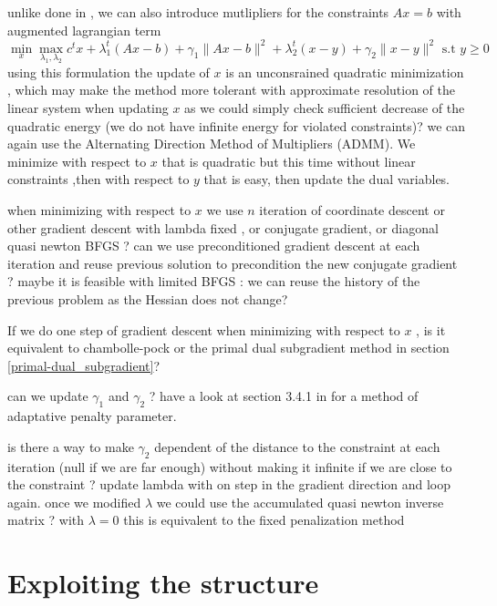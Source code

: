 \documentclass[11pt]{article}
\begin{document}
unlike done in  \cite{Boyd2010}, we can also introduce mutlipliers for the constraints $Ax=b$ with augmented lagrangian term 
\begin{equation}
\mathop{min}_x \mathop{max}_{\lambda_1,\lambda_2} c^tx +\lambda_1^t(Ax-b)+ \gamma_1\|Ax-b\|^2+\lambda_2^t (x-y)+\gamma_2\|x-y\|^2 \text{ s.t } y\geq 0
\end{equation}
using this formulation  the update of $x$ is an unconsrained quadratic minimization , which may make the method more tolerant with approximate resolution of the linear system when updating $x$ as we could simply check sufficient decrease of the quadratic  energy (we do not have infinite energy for violated constraints)? 
we can again use the Alternating Direction Method of Multipliers (ADMM).
We minimize with respect to $x$ that is quadratic but this time without linear constraints ,then with respect to $y$ that is easy, then update the dual variables.



when minimizing with respect to $x$ we use $n$ iteration of coordinate descent or other gradient descent with lambda fixed , or conjugate gradient, or diagonal quasi newton BFGS ? can we use preconditioned gradient descent at each iteration and reuse previous solution to precondition the new conjugate gradient ?
maybe it is feasible with limited BFGS : we can reuse the history of the previous problem as the Hessian does not change? 

If we do one step of gradient descent when minimizing with respect to $x$ , is it equivalent to chambolle-pock or the primal dual subgradient method in section \ref{primal-dual_subgradient}? 


 can we update $\gamma_1$ and $\gamma_2$ ?
have a look at section 3.4.1 in  \cite{Boyd2010} for a method of adaptative penalty parameter.
 
is there a way to make $\gamma_2$ dependent of the distance to the constraint at each iteration (null if we are far enough) without making it infinite if we are close to the constraint ?  update lambda with on step in the gradient direction and loop again. once we modified $\lambda$ we could use the accumulated quasi newton inverse matrix ? with $\lambda=0$ this is equivalent to the fixed penalization method 



\section{Exploiting the structure}
\end{document}
